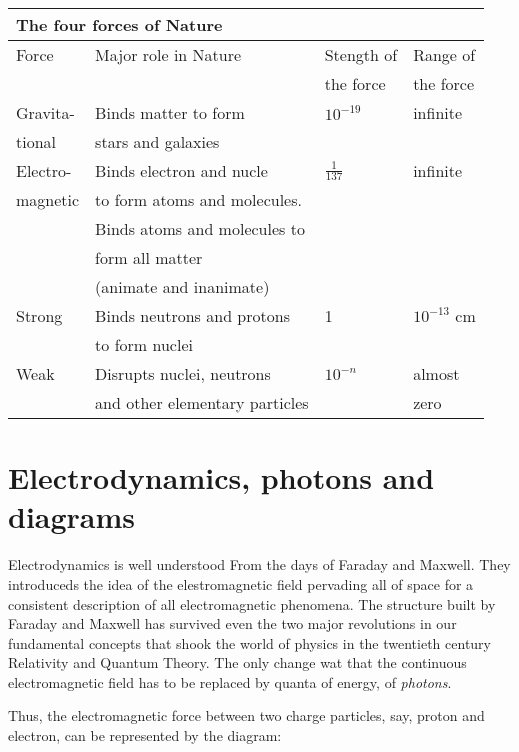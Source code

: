 \begin{center}
\begin{tabular}{|llll|}
\hline
\multicolumn{4}{|l|}{{\bf The four forces of Nature}}\\
\hline
Force & Major role in Nature &Stength of  & Range of \\
      &                      &the force   & the force \\     
\hline
Gravita- & Binds matter to form  & $10^{-19}$ & infinite\\
tional   & stars and galaxies    &           &          \\
Electro- & Binds electron and nucle & $\frac{1}{137}$ & infinite \\
magnetic & to form atoms and molecules. &              &  \\
                &Binds atoms and molecules to  &              &   \\
                &form all matter &      &   \\ 
                &(animate and inanimate)& & \\
Strong & Binds neutrons and protons & 1 & $10^{-13}$ cm \\
       &  to form nuclei            &   &               \\
Weak & Disrupts nuclei, neutrons  &$10^{-n}$  & almost \\
     & and other elementary particles &       & zero   \\
\hline
\end{tabular}
\end{center}


\section*{Electrodynamics, photons and diagrams}

Electrodynamics is well understood From the days of Faraday and Max\-well. They introduceds the idea of the elestromagnetic field pervading all of space for a consistent description of all electromagnetic phenomena. The structure built by Faraday and Maxwell has survived even the two major revolutions in our fundamental concepts that shook the world of physics in the twentieth century Relativity and Quantum Theory. The only change wat that the continuous electromagnetic field has to be replaced by quanta of energy, of {\it photons}.

Thus, the electromagnetic force between two charge particles, say, proton and electron, can be represented by the diagram:


